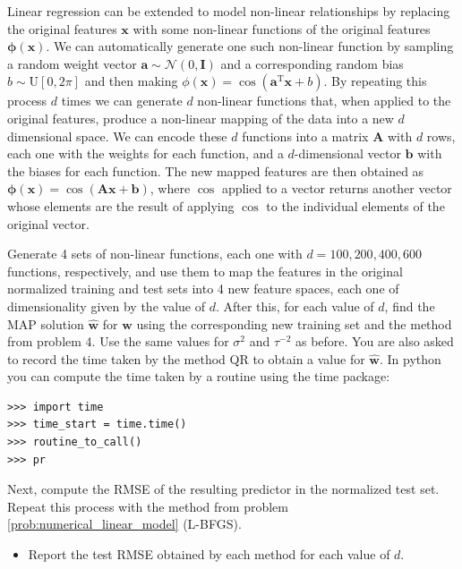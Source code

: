 \documentclass[submit]{harvardml}
\newcommand{\N}{\mathcal{N}}
\begin{document}
\begin{problem}[14pts]\label{prob:non_linear_model}
Linear regression can be extended to model non-linear relationships by
replacing the original features $\mathbf{x}$ with some non-linear functions of
the original features $\bm \phi(\mathbf{x})$. We can automatically generate one
such non-linear function by sampling a random weight vector $\mathbf{a}
\sim \N(0,\mathbf{I})$ and a corresponding random bias $b \sim
\text{U}[0, 2\pi]$ and then making $\phi(\mathbf{x}) = \cos(\mathbf{a}^\text{T}
\mathbf{x} + b)$.  By repeating this process $d$ times we can generate $d$
non-linear functions that, when applied to the original features, produce a
non-linear mapping of the data into a new $d$ dimensional space.
We can encode these $d$ functions into a matrix $\mathbf{A}$ with $d$ rows, each one
with the weights for each function, and a $d$-dimensional vector $\mathbf{b}$
with the biases for each function. The new mapped features are then obtained as
$\bm \phi (\mathbf{x}) = \cos(\mathbf{A} \mathbf{x} + \mathbf{b})$, where
$\cos$ applied to a vector returns another vector whose elements are the result
of applying $\cos$ to the individual elements of the original vector.


Generate 4 sets of non-linear functions, each one with $d=100, 200, 400, 600$ functions, respectively, and use
them to map the features in the original normalized training and test sets into
4 new feature spaces, each one of dimensionality given by the value of $d$. After this, for each
value of $d$, find the MAP solution $\hat{\mathbf{w}}$ for $\mathbf{w}$ using the
corresponding new training set and the method from problem
4. Use the same values for $\sigma^2$ and $\tau^{-2}$ as before.
You are also asked to
record the time taken by the method QR to obtain a value for $\hat{\mathbf{w}}$.
In python  you can compute the time taken by a routine using the time package:
\begin{verbatim}
>>> import time
>>> time_start = time.time()
>>> routine_to_call()
>>> pr
\end{verbatim}
Next, compute the RMSE of the resulting predictor in the normalized test
set. Repeat this process with the method from problem
\ref{prob:numerical_linear_model} (L-BFGS).

\begin{itemize}
\item Report the test RMSE obtained by each method for each value of $d$.
\end{itemize}


\end{problem}
\end{document}

